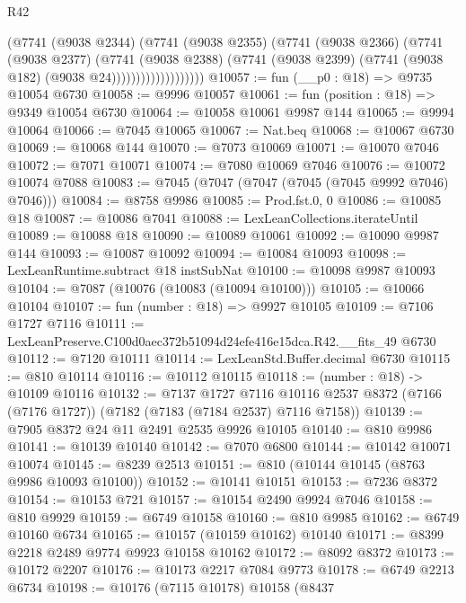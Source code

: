 \begin{lexlean}{R42}
\begin{coremodule}
{                          (@7741
                            (@9038 @2344)
                            (@7741
                              (@9038 @2355)
                              (@7741
                                (@9038 @2366)
                                (@7741
                                  (@9038 @2377)
                                  (@7741
                                    (@9038 @2388)
                                    (@7741
                                      (@9038 @2399)
                                      (@7741 (@9038 @182) (@9038 @24)))))))))))))))))))
@10057 := fun (__p0 : @18) => @9735 @10054 @6730
@10058 := @9996 @10057
@10061 := fun (position : @18) => @9349 @10054 @6730
@10064 := @10058 @10061 @9987 @144
@10065 := @9994 @10064
@10066 := @7045 @10065
@10067 := Nat.beq
@10068 := @10067 @6730
@10069 := @10068 @144
@10070 := @7073 @10069
@10071 := @10070 @7046
@10072 := @7071 @10071
@10074 := @7080 @10069 @7046
@10076 := @10072 @10074 @7088
@10083 := @7045 (@7047 (@7047 (@7045 (@7045 @9992 @7046) @7046)))
@10084 := @8758 @9986
@10085 := Prod.fst.{0, 0}
@10086 := @10085 @18
@10087 := @10086 @7041
@10088 := LexLeanCollections.iterateUntil
@10089 := @10088 @18
@10090 := @10089 @10061
@10092 := @10090 @9987 @144
@10093 := @10087 @10092
@10094 := @10084 @10093
@10098 := LexLeanRuntime.subtract @18 instSubNat
@10100 := @10098 @9987 @10093
@10104 := @7087 (@10076 (@10083 (@10094 @10100)))
@10105 := @10066 @10104
@10107 := fun (number : @18) => @9927 @10105
@10109 := @7106 @1727 @7116
@10111 := LexLeanPreserve.C100d0aec372b51094d24efe416e15dca.R42.__fits_49 @6730
@10112 := @7120 @10111
@10114 := LexLeanStd.Buffer.decimal @6730
@10115 := @810 @10114
@10116 := @10112 @10115
@10118 := (number : @18) -> @10109 @10116
@10132 := @7137
    @1727
    @7116
    @10116
    @2537
    @8372
    (@7166 (@7176 @1727))
    (@7182 (@7183 (@7184 @2537) @7116 @7158))
@10139 := @7905 @8372 @24 @11 @2491 @2535 @9926 @10105
@10140 := @810 @9986
@10141 := @10139 @10140
@10142 := @7070 @6800
@10144 := @10142 @10071 @10074
@10145 := @8239 @2513
@10151 := @810 (@10144 @10145 (@8763 @9986 @10093 @10100))
@10152 := @10141 @10151
@10153 := @7236 @8372
@10154 := @10153 @721
@10157 := @10154 @2490 @9924 @7046
@10158 := @810 @9929
@10159 := @6749 @10158
@10160 := @810 @9985
@10162 := @6749 @10160 @6734
@10165 := @10157 (@10159 @10162) @10140
@10171 := @8399 @2218 @2489 @9774 @9923 @10158 @10162
@10172 := @8092 @8372
@10173 := @10172 @2207
@10176 := @10173 @2217 @7084 @9773
@10178 := @6749 @2213 @6734
@10198 := @10176
    (@7115 @10178)
    @10158
    (@8437
}
\end{coremodule}
\end{lexlean}
